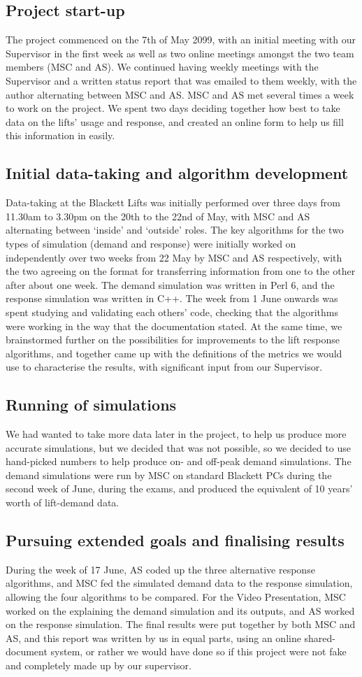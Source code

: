 \documentclass[12pt,a4paper,onecolumn]{Imperial_lab_report}
\begin{document}
\subsection{Project start-up}
The project commenced on the 7th of May 2099, with an initial meeting with our Supervisor in the first week as well as two online meetings amongst the two team members (MSC and AS).
We continued having weekly meetings with the Supervisor and a written status report that was emailed to them weekly, with the author alternating between MSC and AS.
MSC and AS met several times a week to work on the project.
We spent two days deciding together how best to take data on the lifts' usage and response, and created an online form to help us fill this information in easily. 
\subsection{Initial data-taking and algorithm development}
Data-taking at the Blackett Lifts was initially performed over three days from 11.30am to 3.30pm on the 20th to the 22nd of May, with MSC and AS alternating between `inside' and `outside' roles.
The key algorithms for the two types of simulation (demand and response) were initially worked on independently over two weeks from 22 May by MSC and AS respectively, with the two agreeing on the format for transferring information from one to the other after about one week.
The demand simulation was written in Perl 6, and the response simulation was written in C++.
The week from 1 June onwards was spent studying and validating each others' code, checking that the algorithms were working in the way that the documentation stated.
At the same time, we brainstormed further on the possibilities for improvements to the lift response algorithms, and together came up with the definitions of the metrics we would use to characterise the results, with significant input from our Supervisor.
\subsection{Running of simulations}
We had wanted to take more data later in the project, to help us produce more accurate simulations, but we decided that was not possible, so we decided to use hand-picked numbers to help produce on- and off-peak demand simulations.
The demand simulations were run by MSC on standard Blackett PCs during the second week of June, during the exams, and produced the equivalent of 10 years' worth of lift-demand data.
\subsection{Pursuing extended goals and finalising results}
During the week of 17 June, AS coded up the three alternative response algorithms, and MSC fed the simulated demand data to the response simulation, allowing the four algorithms to be compared.
For the Video Presentation, MSC worked on the explaining the demand simulation and its outputs, and AS worked on the response simulation.
The final results were put together by both MSC and AS, and this report was written by us in equal parts, using an online shared-document system, or rather we would have done so if this project were not fake and completely made up by our supervisor.
\end{document}
